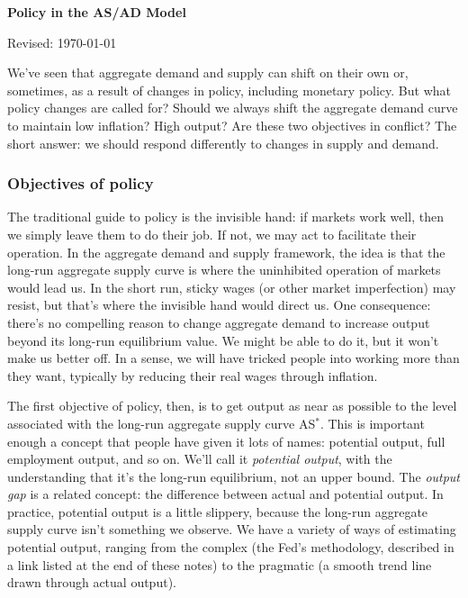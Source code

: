 \documentclass[letterpaper,12pt]{article}
\def\HeadName{Policy in the AS/AD Model}
\begin{document}
\thispagestyle{empty}%
\Head

\centerline{\large \bf \HeadName}%
\centerline{Revised: \today}

\bigskip
We've seen that aggregate demand and supply can shift on their own or,
sometimes, as a result of changes in policy,
including monetary policy.
But what policy changes are called for?
Should we always shift the aggregate demand curve to maintain
low inflation?  High output?
Are these two objectives in conflict?
The short answer:
we should respond differently to changes in supply and demand.


\subsubsection*{Objectives of policy}

The traditional guide to policy is the invisible hand:
if markets work well, then we simply leave them to do their job.
If not, we may act to facilitate their operation.
In the aggregate demand and supply framework,
the idea is that the long-run aggregate supply curve
is where the uninhibited operation of markets would lead us.
In the short run, sticky wages (or other market imperfection)
may resist, but that's
where the invisible hand would direct us.
One consequence:   there's no
compelling reason to change aggregate demand
to increase output beyond its long-run equilibrium value.
We might be able to do it, but it won't make us better off.
In a sense, we will have tricked people into working more than they
want,
typically by reducing their real wages through inflation.

The first objective of policy, then,
is to get output as near as possible to
the level associated with the long-run
aggregate supply curve AS$^*$.
This is important enough a concept that people have given it
lots of names:  potential output, full employment output, and so on.
We'll call it {\it potential output\/}, with the understanding that it's
the long-run equilibrium, not an upper bound.
The {\it output gap\/} is a related concept:
the difference between actual and potential output.
In practice, potential output is a little slippery,
because the long-run aggregate supply curve
isn't something we observe.
We have a variety of ways of estimating potential output,
ranging from the complex (the Fed's methodology, described
in a link listed at the end of these notes) to
the pragmatic (a smooth trend line drawn through actual output).
\end{document}
